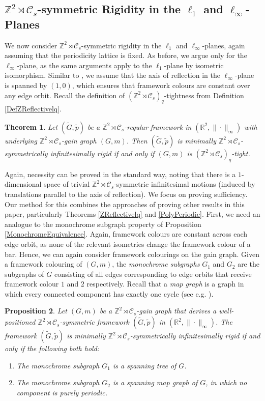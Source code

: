 \documentclass[reqno,a4paper,10pt]{article}
\newtheorem{theorem}{Theorem}[section]
\newtheorem{proposition}[theorem]{Proposition}
\theoremstyle{definition}
\theoremstyle{remark}
\numberwithin{equation}{section}
\numberwithin{figure}{section}
\numberwithin{table}{section}
\newcommand{\R}{\mathbb{R}}
\newcommand{\Z}{\mathbb{Z}}
\newcommand{\G}{\tilde{G}}
\newcommand{\p}{\tilde{p}}
\begin{document}
    \subsection{$\Z^2\rtimes\mathcal{C}_s$-symmetric Rigidity in the $\ell_1$ and $\ell_\infty$-Planes}\label{SectionPolytopicWallpaper}
    We now consider $\Z^2\rtimes\mathcal{C}_s$-symmetric rigidity in the $\ell_1$ and $\ell_\infty$-planes, again assuming that the periodicity lattice is fixed. As before, we argue only for the $\ell_\infty$-plane, as the same arguments apply to the $\ell_1$-plane by isometric isomorphism. Similar to \cite{GridLike}, we assume that the axis of reflection in the $\ell_\infty$-plane is spanned by $(1,0)$, which ensures that framework colours are constant over any edge orbit. Recall the definition of $(\Z^2\rtimes\mathcal{C}_s)_q$-tightness from Definition \ref{DefZReflectivelq}.
    \begin{theorem}\label{ZReflectivePoly}
        Let $(\G,\p)$ be a $\Z^2\rtimes\mathcal{C}_s$-regular framework in $(\R^2,\|\cdot\|_{\infty})$ with underlying $\Z^2\rtimes\mathcal{C}_s$-gain graph $(G,m)$. Then $(\G,\p)$ is minimally $\Z^2\rtimes\mathcal{C}_s$-symmetrically infinitesimally rigid if and only if $(G,m)$ is $(\Z^2\rtimes\mathcal{C}_s)_q$-tight.
    \end{theorem}
    Again, necessity can be proved in the standard way, noting that there is a $1$-dimensional space of trivial $\Z^2\rtimes\mathcal{C}_s$-symmetric infinitesimal motions (induced by translations parallel to the axis of reflection). We focus on proving sufficiency. Our method for this combines the approaches of proving other results in this paper, particularly Theorems \ref{ZReflectivelq} and \ref{PolyPeriodic}. First, we need an analogue to the monochrome subgraph property of Proposition \ref{MonochromeEquivalence}. Again, framework colours are constant across each edge orbit, as none of the relevant isometries change the framework colour of a bar. Hence, we can again consider framework colourings on the gain graph. Given a framework colouring of $(G,m)$, the \emph{monochrome subgraphs} $G_1$ and $G_2$ are the subgraphs of $G$ consisting of all edges corresponding to edge orbits that receive framework colour $1$ and $2$ respectively. Recall that a \emph{map graph} is a graph in which every connected component has exactly one cycle (see e.g. \cite{GridLike}).
    \begin{proposition}\label{MonochromeEquivalenceWallpaper}
        Let $(G,m)$ be a $\Z^2\rtimes\mathcal{C}_s$-gain graph that derives a well-positioned $\Z^2\rtimes\mathcal{C}_s$-symmetric framework $(\G,\p)$ in $(\R^2,\|\cdot\|_\infty)$. The framework $(\G,\p)$ is minimally $\Z^2\rtimes\mathcal{C}_s$-symmetrically infinitesimally rigid if and only if the following both hold:
        \begin{enumerate}
            \item The monochrome subgraph $G_1$ is a spanning tree of $G$.
            \item The monochrome subgraph $G_2$ is a spanning map graph of $G$, in which no component is purely periodic.
        \end{enumerate}
    \end{proposition}
\end{document}
